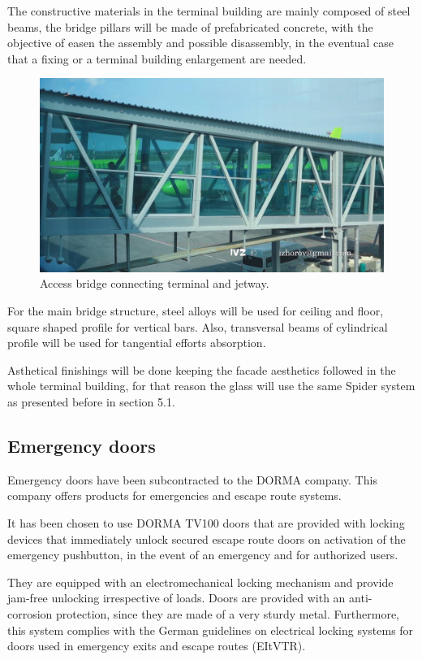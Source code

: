 	The constructive materials in the terminal building are mainly composed of steel beams, the bridge pillars will be made of prefabricated concrete, with the objective of easen the assembly and possible disassembly, in the eventual case that a fixing or a terminal building enlargement are needed.
	
			\begin{figure}[H]
	\centering
\includegraphics[width=13cm]{./images/Facade/access}
\caption{Access bridge connecting terminal and jetway.}
\end{figure}
	
	For the main bridge structure, steel alloys will be used for ceiling and floor, square shaped profile for vertical bars. Also, transversal beams of cylindrical profile will be used for tangential efforts absorption. 
	
	Asthetical finishings will be done keeping the facade aesthetics followed in the whole terminal building, for that reason the glass will use the same Spider system as presented before in section 5.1.
	
		\subsection{Emergency doors}
	Emergency doors have been subcontracted to the DORMA company. This company offers products for emergencies and escape route systems. 
	
	It has been chosen to use DORMA TV100 doors that are provided with locking devices that immediately unlock secured escape route doors on activation of the emergency pushbutton, in the event of an emergency and for authorized users. 
	
	They are equipped with an electromechanical locking mechanism and provide jam-free unlocking irrespective of loads. Doors are provided with an anti-corrosion protection, since they are made of a very sturdy metal. Furthermore, this system complies with the German guidelines on electrical locking systems for doors used in emergency exits and escape routes (EItVTR).
	
